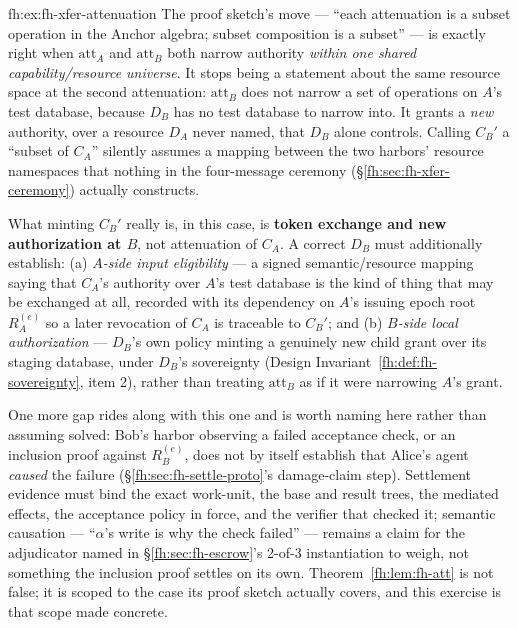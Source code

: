 \begin{pdSolution}{fh:ex:fh-xfer-attenuation}
The proof sketch's move --- ``each attenuation is a subset operation in the Anchor algebra; subset composition is a subset'' --- is exactly right when $\mathrm{att}_A$ and $\mathrm{att}_B$ both narrow authority \emph{within one shared capability/resource universe}. It stops being a statement about the same resource space at the second attenuation: $\mathrm{att}_B$ does not narrow a set of operations on $A$'s test database, because $D_B$ has no test database to narrow into. It grants a \emph{new} authority, over a resource $D_A$ never named, that $D_B$ alone controls. Calling $C_B'$ a ``subset of $C_A$'' silently assumes a mapping between the two harbors' resource namespaces that nothing in the four-message ceremony (\S\ref{fh:sec:fh-xfer-ceremony}) actually constructs.

What minting $C_B'$ really is, in this case, is \textbf{token exchange and new authorization at $B$}, not attenuation of $C_A$. A correct $D_B$ must additionally establish: (a) \emph{$A$-side input eligibility} --- a signed semantic/resource mapping saying that $C_A$'s authority over $A$'s test database is the kind of thing that may be exchanged at all, recorded with its dependency on $A$'s issuing epoch root $R_A^{(e)}$ so a later revocation of $C_A$ is traceable to $C_B'$; and (b) \emph{$B$-side local authorization} --- $D_B$'s own policy minting a genuinely new child grant over its staging database, under $D_B$'s sovereignty (Design Invariant~\ref{fh:def:fh-sovereignty}, item 2), rather than treating $\mathrm{att}_B$ as if it were narrowing $A$'s grant.

One more gap rides along with this one and is worth naming here rather than assuming solved: Bob's harbor observing a failed acceptance check, or an inclusion proof against $R_B^{(e)}$, does not by itself establish that Alice's agent \emph{caused} the failure (\S\ref{fh:sec:fh-settle-proto}'s damage-claim step). Settlement evidence must bind the exact work-unit, the base and result trees, the mediated effects, the acceptance policy in force, and the verifier that checked it; semantic causation --- ``$\alpha$'s write is why the check failed'' --- remains a claim for the adjudicator named in \S\ref{fh:sec:fh-escrow}'s 2-of-3 instantiation to weigh, not something the inclusion proof settles on its own. Theorem~\ref{fh:lem:fh-att} is not false; it is scoped to the case its proof sketch actually covers, and this exercise is that scope made concrete.
\end{pdSolution}
